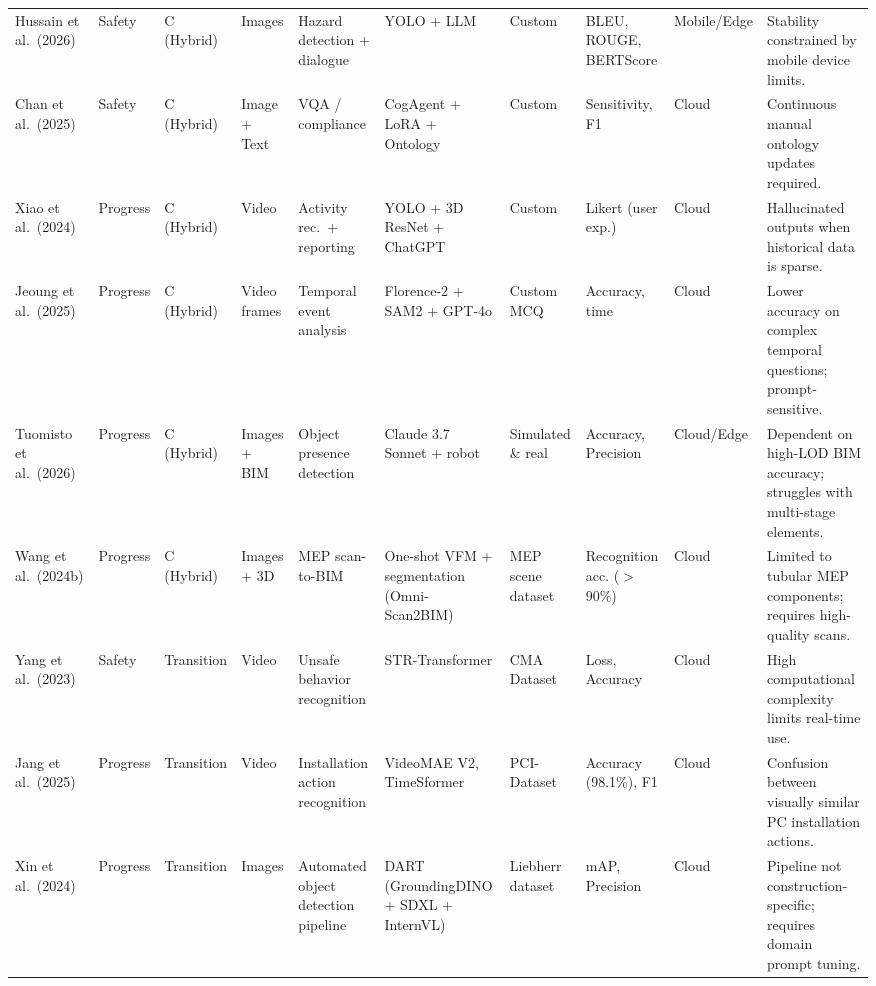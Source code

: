 \documentclass[10pt,letterpaper]{article}
\begin{document}
\begin{landscape}
\begin{longtable}{L{2.8cm} L{1.7cm} L{2.0cm} L{2.5cm} L{1.5cm} L{3.0cm} L{1.8cm} L{2.0cm} L{1.6cm} L{3.2cm}}
Hussain et al.\ (2026) & Safety & C (Hybrid) & Images & Hazard detection + dialogue & YOLO + LLM & Custom & BLEU, ROUGE, BERTScore & Mobile/Edge & Stability constrained by mobile device limits.\\

Chan et al.\ (2025) & Safety & C (Hybrid) & Image + Text & VQA / compliance & CogAgent + LoRA + Ontology & Custom & Sensitivity, F1 & Cloud & Continuous manual ontology updates required.\\

Xiao et al.\ (2024) & Progress & C (Hybrid) & Video & Activity rec.\ + reporting & YOLO + 3D ResNet + ChatGPT & Custom & Likert (user exp.) & Cloud & Hallucinated outputs when historical data is sparse.\\

Jeoung et al.\ (2025) & Progress & C (Hybrid) & Video frames & Temporal event analysis & Florence-2 + SAM2 + GPT-4o & Custom MCQ & Accuracy, time & Cloud & Lower accuracy on complex temporal questions; prompt-sensitive.\\

Tuomisto et al.\ (2026) & Progress & C (Hybrid) & Images + BIM & Object presence detection & Claude 3.7 Sonnet + robot & Simulated \& real & Accuracy, Precision & Cloud/Edge & Dependent on high-LOD BIM accuracy; struggles with multi-stage elements.\\

Wang et al.\ (2024b) & Progress & C (Hybrid) & Images + 3D & MEP scan-to-BIM & One-shot VFM + segmentation (Omni-Scan2BIM) & MEP scene dataset & Recognition acc. ($>$90\%) & Cloud & Limited to tubular MEP components; requires high-quality scans.\\

Yang et al.\ (2023) & Safety & Transition & Video & Unsafe behavior recognition & STR-Transformer & CMA Dataset & Loss, Accuracy & Cloud & High computational complexity limits real-time use.\\

Jang et al.\ (2025) & Progress & Transition & Video & Installation action recognition & VideoMAE V2, TimeSformer & PCI-Dataset & Accuracy (98.1\%), F1 & Cloud & Confusion between visually similar PC installation actions.\\

Xin et al.\ (2024) & Progress & Transition & Images & Automated object detection pipeline & DART (GroundingDINO + SDXL + InternVL) & Liebherr dataset & mAP, Precision & Cloud & Pipeline not construction-specific; requires domain prompt tuning.\\


\end{longtable}
\end{landscape}
\end{document}
